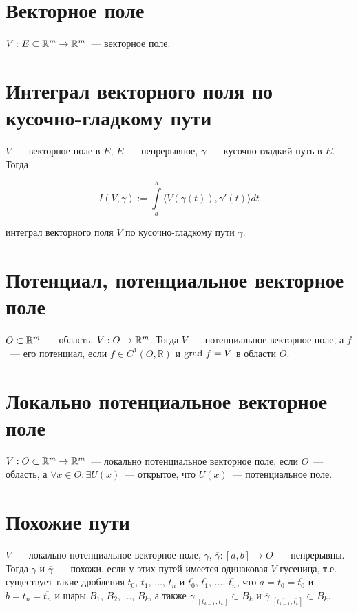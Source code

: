 \documentclass{article}
\begin{document}
    \newpage
    
    \section{Векторное поле}
    
        $V : E \subset \mathbb{R}^m \rightarrow \mathbb{R}^m$~--- векторное поле.
        
    \newpage
    
    \section{Интеграл векторного поля по кусочно-гладкому пути}
    
        $V$~--- векторное поле в $E$, $E$~--- непрерывное, $\gamma$~--- кусочно-гладкий путь в $E$. Тогда
        
        $$I(V, \gamma) := \int\limits^b_a \langle V \left( \gamma(t) \right), \gamma' (t) \rangle dt$$
        
        интеграл векторного поля $V$ по кусочно-гладкому пути $\gamma$.
        
    \newpage
    
    \section{Потенциал, потенциальное векторное поле}
    
        $O \subset \mathbb{R}^m$~--- область, $V : O \rightarrow \mathbb{R}^m$. Тогда $V$~--- потенциальное векторное поле, а $f$~--- его потенциал, если $f \in C^1 \left( O, \mathbb{R} \right)$ и $\grad f = V$ в области $O$.
        
    \newpage
    
    \section{Локально потенциальное векторное поле}
    
        $V : O \subset \mathbb{R}^m \rightarrow \mathbb{R}^m$~--- локально потенциальное векторное поле, если $O$~--- область, а $\forall x \in O : \exists U(x)$~--- открытое, что $U(x)$~--- потенциальное поле.
        
    \newpage
    
    \section{Похожие пути}
    
        $V$~--- локально потенциальное векторное поле, $\gamma$, $\overline{\gamma} : [a, b] \rightarrow O$~--- непрерывны. Тогда $\gamma$ и $\overline{\gamma}$~--- похожи, если у этих путей имеется одинаковая $V$-гусеница, т.е. существует такие дробления $t_0$, $t_1$, $\ldots$, $t_n$ и $\overline{t_0}$, $\overline{t_1}$, $\ldots$, $\overline{t_n}$, что $a = t_0 = \overline{t_0}$ и $b = t_n = \overline{t_n}$ и шары $B_1$, $B_2$, $\ldots$, $B_k$, а также $\gamma \big|_{[t_{k - 1}, t_k]} \subset B_k$ и $\overline{\gamma} \big|_{[\overline{t_{k - 1}}, \overline{t_k}]} \subset B_k$.
        
\end{document}

